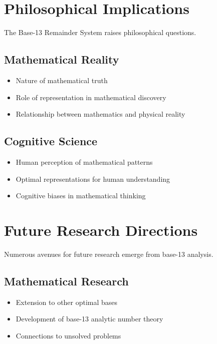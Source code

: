 \documentclass[12pt,a4paper]{report}
\begin{document}
\section{Philosophical Implications}

The Base-13 Remainder System raises philosophical questions.

\subsection{Mathematical Reality}

\begin{itemize}
\item Nature of mathematical truth
\item Role of representation in mathematical discovery
\item Relationship between mathematics and physical reality
\end{itemize}

\subsection{Cognitive Science}

\begin{itemize}
\item Human perception of mathematical patterns
\item Optimal representations for human understanding
\item Cognitive biases in mathematical thinking
\end{itemize}

\section{Future Research Directions}

Numerous avenues for future research emerge from base-13 analysis.

\subsection{Mathematical Research}

\begin{itemize}
\item Extension to other optimal bases
\item Development of base-13 analytic number theory
\item Connections to unsolved problems
\end{itemize}
\end{document}
